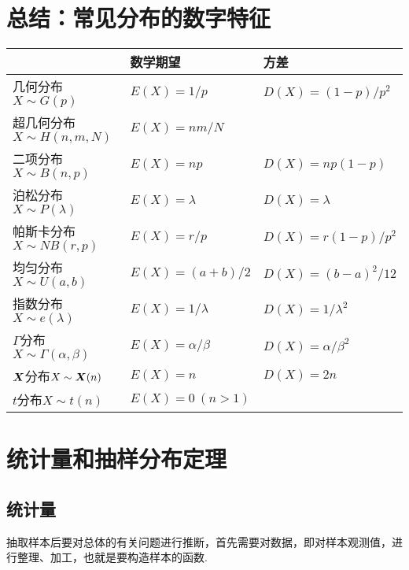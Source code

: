 \section{总结：常见分布的数字特征}
\begin{center}
\begin{tabular}{p{3.5cm}|p{4cm}p{4cm}}
\hline
& 数学期望 & 方差 \\ \hline
几何分布\newline\(X \sim G(p)\) & \(E(X) = 1/p\) & \(D(X) = (1-p)/p^2\) \\ \hline
超几何分布\newline\(X \sim H(n,m,N)\) & \(E(X) = nm/N\) \\ \hline
二项分布\newline\(X \sim B(n,p)\) & \(E(X) = np\) & \(D(X) = np(1-p)\) \\ \hline
泊松分布\newline\(X \sim P(\lambda)\) & \(E(X) = \lambda\) & \(D(X) = \lambda\) \\ \hline
帕斯卡分布\newline\(X \sim NB(r,p)\) & \(E(X) = r/p\) & \(D(X) = r(1-p)/p^2\) \\ \hline
均匀分布\newline\(X \sim U(a,b)\) & \(E(X) = (a+b)/2\) & \(D(X) = (b-a)^2/12\) \\ \hline
指数分布\newline\(X \sim e(\lambda)\) & \(E(X) = 1/\lambda\) & \(D(X) = 1/\lambda^2\) \\ \hline
\(\Gamma\)分布\newline\(X \sim \Gamma(\alpha,\beta)\) & \(E(X) = \alpha/\beta\) & \(D(X) = \alpha/\beta^2\) \\ \hline
\(\boldsymbol{X}\)分布\newline\(X \sim \boldsymbol{X}(n)\) & \(E(X) = n\) & \(D(X) = 2n\) \\ \hline
\(t\)分布\newline\(X \sim t(n)\) & \(E(X) = 0\ (n>1)\) \\ \hline
\end{tabular}
\end{center}

\section{统计量和抽样分布定理}
\subsection{统计量}
抽取样本后要对总体的有关问题进行推断，首先需要对数据，即对样本观测值，进行整理、加工，也就是要构造样本的函数.

